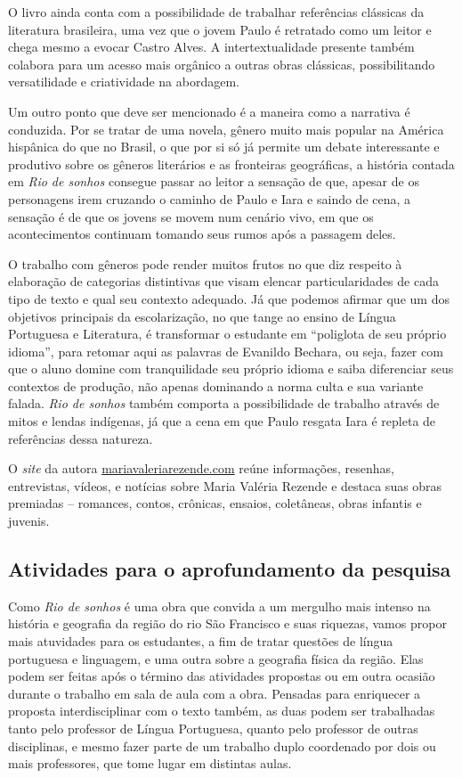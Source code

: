 \documentclass[12pt]{extarticle}
\begin{document}
  O livro ainda conta com a possibilidade de trabalhar referências
  clássicas da literatura brasileira, uma vez que o jovem Paulo é
  retratado como um leitor e chega mesmo a evocar Castro Alves. A
  intertextualidade presente também colabora para um acesso mais
  orgânico a outras obras clássicas, possibilitando versatilidade e
  criatividade na abordagem.

  Um outro ponto que deve ser mencionado é a maneira como a narrativa é
  conduzida. Por se tratar de uma novela, gênero muito mais popular na
  América hispânica do que no Brasil, o que por si só já permite um
  debate interessante e produtivo sobre os gêneros literários e as
  fronteiras geográficas, a história contada em \emph{Rio de sonhos}
  consegue passar ao leitor a sensação de que, apesar de os personagens
  irem cruzando o caminho de Paulo e Iara e saindo de cena, a sensação é
  de que os jovens se movem num cenário vivo, em que os acontecimentos
  continuam tomando seus rumos após a passagem deles.

  O trabalho com gêneros pode render muitos frutos no que diz respeito à
  elaboração de categorias distintivas que visam elencar
  particularidades de cada tipo de texto e qual seu contexto adequado.
  Já que podemos afirmar que um dos objetivos principais da
  escolarização, no que tange ao ensino de Língua Portuguesa e
  Literatura, é transformar o estudante em ``poliglota de seu próprio
  idioma'', para retomar aqui as palavras de Evanildo Bechara, ou seja,
  fazer com que o aluno domine com tranquilidade seu próprio idioma e
  saiba diferenciar seus contextos de produção, não apenas dominando a
  norma culta e sua variante falada. \emph{Rio de sonhos} também
  comporta a possibilidade de trabalho através de mitos e lendas
  indígenas, já que a cena em que Paulo resgata Iara é repleta de
  referências dessa natureza.

  O \emph{site} da autora
  \href{https://www.mariavaleriarezende.com/}{mariavaleriarezende.com}
  reúne informações, resenhas, entrevistas, vídeos, e notícias sobre
  Maria Valéria Rezende e destaca suas obras premiadas -- romances,
  contos, crônicas, ensaios, coletâneas, obras infantis e juvenis.

\subsection{Atividades para o aprofundamento da pesquisa}

  Como \emph{Rio de sonhos} é uma obra que convida a um mergulho mais
  intenso na história e geografia da região do rio São Francisco e suas
  riquezas, vamos propor mais atuvidades para os
  estudantes, a fim de tratar questões de língua portuguesa e linguagem, e
  uma outra sobre a geografia física da região. Elas podem ser feitas
  após o término das atividades propostas ou em outra ocasião durante o
  trabalho em sala de aula com a obra. Pensadas para enriquecer a
  proposta interdisciplinar com o texto também, as duas podem ser
  trabalhadas tanto pelo professor de Língua Portuguesa, quanto pelo
  professor de outras disciplinas, e mesmo fazer parte de um trabalho
  duplo coordenado por dois ou mais professores, que tome lugar em
  distintas aulas.
\end{document}
